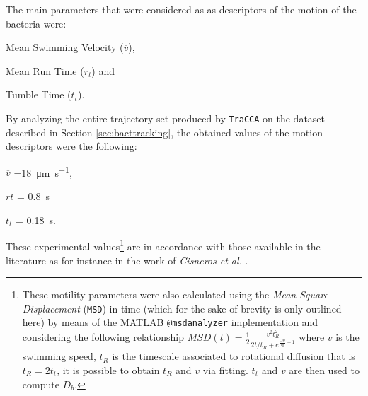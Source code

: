 \documentclass[conference]{IEEEtran}
\begin{document}
The main parameters that were considered as as descriptors of the motion of the bacteria were: 
\begin{inparadesc}
\item[Mean Swimming Velocity] ($\overline{v}$),
\item[Mean Run Time] ($\overline{r_t}$) and 
\item[Tumble Time] ($\overline{t_t}$).
\end{inparadesc}
By analyzing the entire trajectory set produced by \texttt{TraCCA} on the dataset described in Section \ref{sec:bacttracking}, the obtained values of the motion descriptors  were the following: \begin{inparadesc}
\item[$\overline{v}$] =\SI{18}{\micro\meter \per \second},
\item[$\overline{rt}$] = \SI{0.8}{\second}
\item[$\overline{t_t}$]= \SI{0.18}{\second}.
\end{inparadesc}
These experimental values\footnote{These motility parameters were also calculated using the \textit{Mean Square Displacement} (\texttt{MSD}) in time (which for the sake of brevity is only outlined here) by means of the MATLAB \texttt{@msdanalyzer} implementation \cite{msdanalyzer} and considering the following relationship $MSD(t)=\frac{1}{2}\frac{v^2 t_R^2}{2t/t_R +e^{\frac{-2t}{t_R}-1}}$ \cite{Howse2007} where $v$ is the swimming speed, $t_R$ is the timescale associated to rotational diffusion that is $t_R=2t_t$, it is possible to obtain $t_R $ and $v$ via fitting. $t_t$ and $v$ are then used to compute $D_b$.} are in accordance with those available in the literature as for instance in the work of \textit{Cisneros et al.} \cite{Cisneros:2011}.
\end{document}
